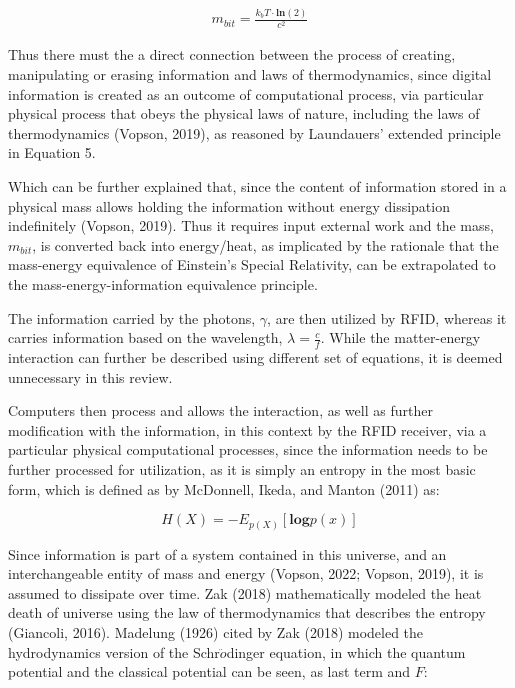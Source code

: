 \documentclass[12pt]{article}
\begin{document}
\begin{align}
	m_{bit} = \frac{k_{b} T \cdot \boldsymbol{ln}(2)}{c^2}
\end{align}

Thus there must the a direct connection between the process of creating, manipulating or erasing information and laws of thermodynamics, since digital information is created as an outcome of computational process, via particular physical process that obeys the physical laws of nature, including the laws of thermodynamics (Vopson, 2019), as reasoned by Laundauers' extended principle in Equation 5.

Which can be further explained that, since the content of information stored in a physical mass allows holding the information without energy dissipation indefinitely (Vopson, 2019). Thus it requires input external work and the mass, $m_{bit}$, is converted back into energy/heat, as implicated by the rationale that the mass-energy equivalence of Einstein's Special Relativity, can be extrapolated to the mass-energy-information equivalence principle.

The information carried by the photons, $\gamma$, are then utilized by RFID, whereas it carries information based on the wavelength, $\lambda = \frac{c}{f}$. While the matter-energy interaction can further be described using different set of equations, it is deemed unnecessary in this review.

Computers then process and allows the interaction, as well as further modification with the information, in this context by the RFID receiver, via a particular physical computational processes, since the information needs to be further processed for utilization, as it is simply an entropy in the most basic form,  which is defined as by McDonnell, Ikeda, and Manton (2011) as:

\begin{equation}
	H(X) = -E_{p(X)} [\boldsymbol{log} p(x)]
\end{equation}

Since information is part of a system contained in this universe, and an interchangeable entity of mass and energy (Vopson, 2022; Vopson, 2019), it is assumed to dissipate over time. Zak (2018) mathematically modeled the heat death of universe using the law of thermodynamics that describes the entropy (Giancoli, 2016). Madelung (1926) cited by Zak (2018) modeled the hydrodynamics version of the Schr$\ddot{o}$dinger equation, in which the quantum potential and the classical potential can be seen, as last term and $F$:
\end{document}
